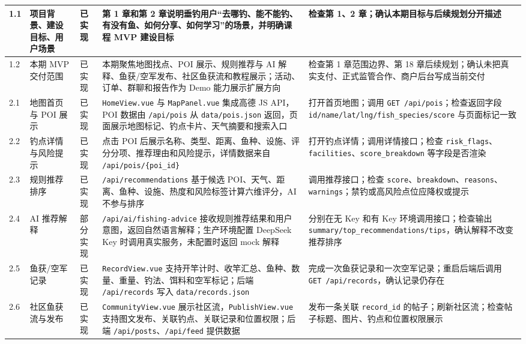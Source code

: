 \begin{longtable}{|p{0.6cm}|p{3.0cm}|p{1.7cm}|p{5.4cm}|p{3.7cm}|}
  1.1 & 项目背景、建设目标、用户场景 & 已实现 & 第 1 章和第 2 章说明垂钓用户“去哪钓、能不能钓、有没有鱼、如何分享、如何学习”的场景，并明确课程 MVP 建设目标 & 检查第 1、2 章；确认本期目标与后续规划分开描述 \\
  \hline
  1.2 & 本期 MVP 交付范围 & 已实现 & 本期聚焦地图找点、POI 展示、规则推荐与 AI 解释、鱼获/空军发布、社区鱼获流和教程展示；活动、订单、群聊和报告作为 Demo 能力展示扩展方向 & 检查第 1 章范围边界、第 18 章后续规划；确认未把真实支付、正式监管合作、商户后台写成当前交付 \\
  \hline
  2.1 & 地图首页与 POI 展示 & 已实现 & \texttt{HomeView.vue} 与 \texttt{MapPanel.vue} 集成高德 JS API，POI 数据由 \texttt{/api/pois} 从 \texttt{data/pois.json} 返回，页面展示地图标记、钓点卡片、天气摘要和搜索入口 & 打开首页地图；调用 \texttt{GET /api/pois}；检查返回字段 \texttt{id/name/lat/lng/fish\_species/score} 与页面标记一致 \\
  \hline
  2.2 & 钓点详情与风险提示 & 已实现 & 点击 POI 后展示名称、类型、距离、鱼种、设施、评分分项、推荐理由和风险提示，详情数据来自 \texttt{/api/pois/\{poi\_id\}} & 打开钓点详情；调用详情接口；检查 \texttt{risk\_flags}、\texttt{facilities}、\texttt{score\_breakdown} 等字段是否渲染 \\
  \hline
  2.3 & 规则推荐排序 & 已实现 & \texttt{/api/recommendations} 基于候选 POI、天气、距离、鱼种、设施、热度和风险标签计算六维评分，AI 不参与排序 & 调用推荐接口；检查 \texttt{score}、\texttt{breakdown}、\texttt{reasons}、\texttt{warnings}；禁钓或高风险点位应降权或提示 \\
  \hline
  2.4 & AI 推荐解释 & 部分实现 & \texttt{/api/ai/fishing-advice} 接收规则推荐结果和用户意图，返回自然语言解释；生产环境配置 DeepSeek Key 时调用真实服务，未配置时返回 mock 解释 & 分别在无 Key 和有 Key 环境调用接口；检查输出 \texttt{summary/top\_recommendations/tips}，确认解释不改变推荐排序 \\
  \hline
  2.5 & 鱼获/空军记录 & 已实现 & \texttt{RecordView.vue} 支持开竿计时、收竿汇总、鱼种、数量、重量、钓法、饵料和空军标记；后端 \texttt{/api/records} 写入 \texttt{data/records.json} & 完成一次鱼获记录和一次空军记录；重启后端后调用 \texttt{GET /api/records}，确认记录仍存在 \\
  \hline
  2.6 & 社区鱼获流与发布 & 已实现 & \texttt{CommunityView.vue} 展示社区流，\texttt{PublishView.vue} 支持图文发布、关联钓点、关联记录和位置权限；后端 \texttt{/api/posts}、\texttt{/api/feed} 提供数据 & 发布一条关联 \texttt{record\_id} 的帖子；刷新社区流；检查帖子标题、图片、钓点和位置权限展示 \\

\end{longtable}
